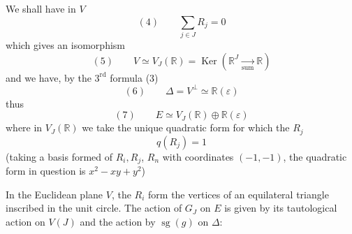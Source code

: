 We shall have in $V$
\[
(4)\qquad\sum_{j\in J}R_j=0
\]
which gives an isomorphism
\[
(5)\qquad V\simeq V_J(\mathbb R)=\operatorname{Ker}(\mathbb R^J\xrightarrow[\text{sum}]{}\mathbb R)
\]
and we have, by the $3^{\text{rd}}$ formula (3)
\[
(6)\qquad\Delta=V^\perp\simeq\mathbb R(\varepsilon)
\]
thus
\[
(7)\qquad E\simeq V_J(\mathbb R)\oplus\mathbb R(\varepsilon)
\]
where in $V_J(\mathbb R)$ we take the unique quadratic form  for which the $R_j$   
\[
q(R_j)=1
\]
(taking a basis formed of $R_i,R_j$, $R_n$ with coordinates $(-1,-1)$, the quadratic form in question is $x^2-xy+y^2$)

In the Euclidean plane $V$, the $R_i$  form the vertices of an equilateral triangle inscribed in the unit circle. The action of $G_J$ on $E$ is given by its tautological action  on $V(J)$ and the action by $\operatorname{sg}(g)$ on $\Delta$:
